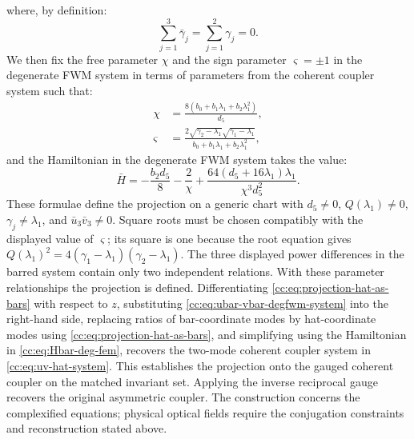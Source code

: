 \documentclass[11pt,a4paper]{article}
\numberwithin{equation}{section}
\begin{document}
where, by definition:
\begin{equation}
\sum_{j=1}^{3} {\bar{\gamma}}_{j} = \sum_{j=1}^{2} {\gamma}_{j} = 0.
\end{equation}
We then fix the free parameter $\chi$ and the sign parameter $\varsigma=\pm1$ in the degenerate FWM system in terms of parameters from the coherent coupler system such that:
\begin{align}
  \chi &= \frac{8 \left( {b}_{0} + {b}_{1} {\lambda}_{1} + {b}_{2} {\lambda}_{1}^{2} \right)}{{d}_{5}}, \\
  \varsigma &= \frac{2 \sqrt{{\gamma}_{2} - {\lambda}_{1}} \sqrt{{\gamma}_{1} - {\lambda}_{1}}}{{b}_{0} + {b}_{1} {\lambda}_{1} + {b}_{2} {\lambda}_{1}^{2}},
\end{align}
and the Hamiltonian in the degenerate FWM system takes the value:
\begin{equation}
  \bar{H} = - \frac{{b}_{2} {d}_{5}}{8} - \frac{2}{\chi} + \frac{64 \left({d}_{5} + 16 {\lambda}_{1}\right) {\lambda}_{1}}{\chi^{3} {d}_{5}^{2}}.
\end{equation}
These formulae define the projection on a generic chart with $d_5\ne0$, $Q(\lambda_1)\ne0$, $\gamma_j\ne\lambda_1$, and $\bar u_3\bar v_3\ne0$.
Square roots must be chosen compatibly with the displayed value of $\varsigma$; its square is one because the root equation gives $Q(\lambda_1)^2=4(\gamma_1-\lambda_1)(\gamma_2-\lambda_1)$.
The three displayed power differences in the barred system contain only two independent relations.
With these parameter relationships the projection is defined. Differentiating \eqref{cc:eq:projection-hat-as-bars} with respect to $z$, substituting \eqref{cc:eq:ubar-vbar-degfwm-system} into the right-hand side, replacing ratios of bar-coordinate modes by hat-coordinate modes using \eqref{cc:eq:projection-hat-as-bars}, and simplifying using the Hamiltonian in \eqref{cc:eq:Hbar-deg-fem}, recovers the two-mode coherent coupler system in \eqref{cc:eq:uv-hat-system}.
This establishes the projection onto the gauged coherent coupler on the matched invariant set.
Applying the inverse reciprocal gauge recovers the original asymmetric coupler.
The construction concerns the complexified equations; physical optical fields require the conjugation constraints and reconstruction stated above. 
\end{document}
